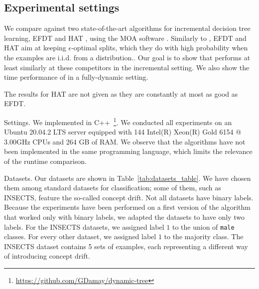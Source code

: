 \subsection{Experimental settings}
We compare \algo{} against two state-of-the-art algorithms for incremental decision tree learning, EFDT \cite{Manapragada2018_EFDT} and HAT \cite{bifet2009_AdaptiveLearning}, using the MOA software \cite{Bifet2010_MOA}. Similarly to \algo{}, EFDT and HAT aim at keeping $\epsilon$-optimal splits, which they do with high probability when the examples are i.i.d. from a distribution.. Our goal is to show that \algo{} performs at least similarly at these competitors in the incremental setting. We also show the time performance of \algo{} in a fully-dynamic setting.

The results for HAT are not given as they are constantly at most as good as EFDT.

\begin{paragraph}{Settings.}
We implemented \algo{} in C++~\footnote{\url{https://github.com/GDamay/dynamic-tree}}. We conducted all experiments on an Ubuntu 20.04.2 LTS server equipped with 144 Intel(R) Xeon(R) Gold 6154 @ 3.00GHz CPUs and 264 GB of RAM. We observe that the algorithms have not been implemented in the same programming language, which limits the relevance of the runtime comparison.
\end{paragraph}

\begin{paragraph}{Datasets.} Our datasets are shown in Table~\ref{tab:datasets_table}. We have chosen them among standard datasets for classification; some of them, such as INSECTS, feature the so-called concept drift. Not all datasets have binary labels. Because the experiments have been performed on a first version of the algorithm that worked only with binary labels, we adapted the datasets to have only two labels. For the INSECTS datasets, we assigned label $1$ to  the union of \texttt{male} classes. For every other dataset, we assigned label $1$ to the majority class. The INSECTS dataset contains 5 sets of examples, each representing a different way of introducing concept drift. 
\end{paragraph}


